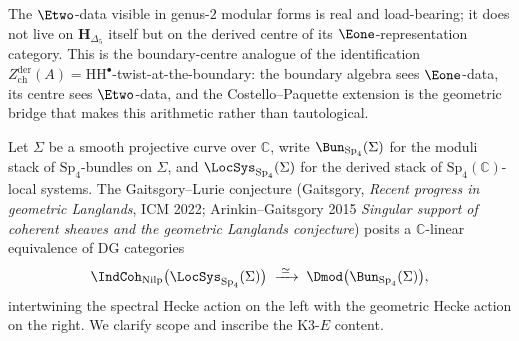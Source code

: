\begin{remark}
The $\Etwo$-data visible in genus-$2$ modular forms is real and
load-bearing; it does not live on $\mathbf H_{\Delta_5}$ itself but on
the derived centre of its $\Eone$-representation category. This is the
boundary-centre analogue of the identification
$Z^{\mathrm{der}}_{\mathrm{ch}}(A)=\mathrm{HH}^\bullet$-twist-at-the-boundary:
the boundary algebra sees $\Eone$-data, its centre sees $\Etwo$-data,
and the Costello--Paquette extension is the geometric bridge that
makes this arithmetic rather than tautological.
\end{remark}

\begin{proposition}
\label{prop:qgf-gaitsgory-lurie-sp4-delta10-bnp-action}
Let $\Sigma$ be a smooth projective curve over $\mathbb C$, write
$\Bun_{\mathrm{Sp}_4}(\Sigma)$ for the moduli stack of
$\mathrm{Sp}_4$-bundles on $\Sigma$, and
$\LocSys_{\mathrm{Sp}_4}(\Sigma)$ for the derived stack of
$\mathrm{Sp}_4(\mathbb C)$-local systems. The Gaitsgory--Lurie
conjecture (Gaitsgory, \emph{Recent progress in geometric Langlands},
ICM 2022; Arinkin--Gaitsgory 2015 \emph{Singular support of coherent
sheaves and the geometric Langlands conjecture}) posits a
$\mathbb C$-linear equivalence of DG categories
\[
 \IndCoh_{\mathrm{Nilp}}\bigl(\LocSys_{\mathrm{Sp}_4}(\Sigma)\bigr)
 \;\xrightarrow{\;\simeq\;}\;
 \Dmod\bigl(\Bun_{\mathrm{Sp}_4}(\Sigma)\bigr),
\]
intertwining the spectral Hecke action on the left with the geometric
Hecke action on the right. We clarify scope and inscribe the K3-$E$
content.


\end{proposition}
